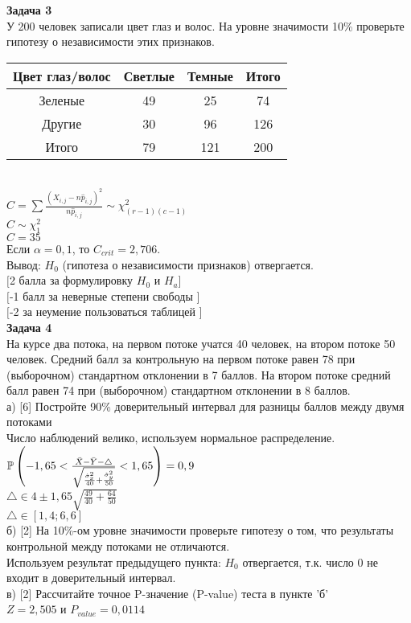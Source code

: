 \documentclass[pdftex,12pt,a4paper]{article}
\begin{document}
{\bf Задача 3} \\
У 200 человек записали цвет глаз и волос. На уровне значимости
10\% проверьте гипотезу о независимости этих признаков. \\
\begin{tabular}{|c|c|c|c|}
  \hline
  Цвет глаз/волос & Светлые & Темные & Итого \\
  \hline
  Зеленые & 49 & 25 & 74 \\
  Другие & 30 & 96 & 126 \\
  \hline
  Итого & 79 & 121 & 200 \\
  \hline
\end{tabular} \\
$C=\sum \frac{(X_{i,j}-n \hat{p}_{i,j})^{2}}{n\hat{p}_{i,j}}\sim
\chi_{(r-1)(c-1)}^{2}$ \\
$C\sim \chi_{1}^{2}$ \\
$C=35$ \\
Если $\alpha=0,1$, то $C_{crit}=2,706$. \\
Вывод: $H_{0}$ (гипотеза о независимости признаков) отвергается. \\
$[$2 балла за формулировку $H_{0}$ и $H_{a}]$ \\
$[$-1 балл за неверные степени свободы $]$ \\
$[$-2 за неумение пользоваться таблицей $]$ \\



{\bf Задача 4} \\
На курсе два потока, на первом потоке учатся 40 человек, на втором
потоке 50 человек. Средний балл за контрольную на первом потоке
равен 78 при (выборочном) стандартном отклонении в 7 баллов. На
втором потоке средний балл равен 74 при (выборочном) стандартном
отклонении в 8 баллов. \\
а) [6] Постройте 90\% доверительный интервал для разницы баллов
между
двумя потоками \\
Число наблюдений велико, используем нормальное распределение. \\
$\P\left(-1,65<\frac{\bar{X}-\bar{Y}-\triangle}{\sqrt{\frac{\hat{\sigma}_{x}^{2}}{40}+\frac{\hat{\sigma}_{y}^{2}}{50}}}<1,65\right)=0,9$ \\
$\triangle \in 4 \pm 1,65\sqrt{\frac{49}{40}+\frac{64}{50}}$ \\
$\triangle \in [1,4;6,6]$ \\
 б) [2] На 10\%-ом уровне значимости проверьте
гипотезу о том, что
результаты контрольной между потоками не отличаются. \\
Используем результат предыдущего пункта: $H_{0}$ отвергается, т.к.
число 0 не входит в доверительный интервал. \\
в) [2] Рассчитайте точное P-значение (P-value) теста в пункте 'б' \\
$Z=2,505$ и $P_{value}=0,0114$ \\
\end{document}
